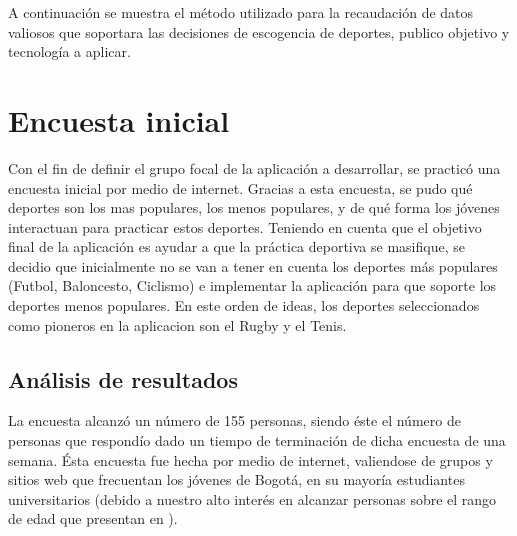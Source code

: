 A continuación se muestra el método utilizado para la recaudación de datos valiosos que soportara las decisiones de escogencia de deportes, publico objetivo y tecnología a aplicar.

\section{Encuesta inicial}

Con el fin de definir el grupo focal de la aplicación a desarrollar, se practicó una encuesta inicial por medio de internet. Gracias a esta encuesta, se pudo qué deportes son los mas populares, los menos populares, y de qué forma los jóvenes interactuan para practicar estos deportes. Teniendo en cuenta que el objetivo final de la aplicación es ayudar a que la práctica deportiva se masifique, se decidio que inicialmente no se van a tener en cuenta los deportes más populares (Futbol, Baloncesto, Ciclismo) e implementar la aplicación para que soporte los deportes menos populares. En este orden de ideas, los deportes seleccionados como pioneros en la aplicacion son el Rugby y el Tenis.

\subsection{Análisis de resultados}

La encuesta alcanzó un número de 155 personas, siendo éste el número de personas que respondío dado un tiempo de terminación de dicha encuesta de una semana. Ésta encuesta fue hecha por medio de internet, valiendose de grupos y sitios web que frecuentan los jóvenes de Bogotá, en su mayoría estudiantes universitarios (debido a nuestro alto interés en alcanzar personas sobre el rango de edad que presentan en \cite{user_behavior_online}).\\

